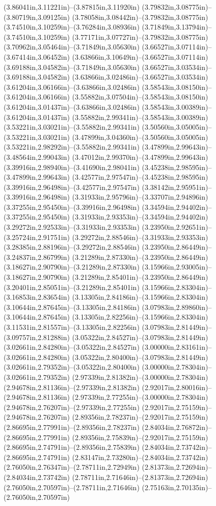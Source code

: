 (3.86041in,3.11221in)--(3.87815in,3.11920in) (3.79832in,3.08775in)--(3.80719in,3.09125in) (3.78058in,3.08442in)--(3.79832in,3.08775in) (3.74510in,3.10259in)--(3.76284in,3.08936in) (3.71849in,3.13794in)--(3.74510in,3.10259in) (3.77171in,3.07727in)--(3.79832in,3.08775in) (3.70962in,3.05464in)--(3.71849in,3.05630in) (3.66527in,3.07114in)--(3.67414in,3.06452in) (3.63866in,3.10649in)--(3.66527in,3.07114in) (3.69188in,3.04582in)--(3.71849in,3.05630in) (3.66527in,3.03534in)--(3.69188in,3.04582in) (3.63866in,3.02486in)--(3.66527in,3.03534in) (3.61204in,3.06166in)--(3.63866in,3.02486in) (3.58543in,3.08150in)--(3.61204in,3.06166in) (3.55882in,3.07504in)--(3.58543in,3.08150in) (3.61204in,3.01437in)--(3.63866in,3.02486in) (3.58543in,3.00389in)--(3.61204in,3.01437in) (3.55882in,2.99341in)--(3.58543in,3.00389in) (3.53221in,3.03021in)--(3.55882in,2.99341in) (3.50560in,3.05005in)--(3.53221in,3.03021in) (3.47899in,3.04360in)--(3.50560in,3.05005in) (3.53221in,2.98292in)--(3.55882in,2.99341in) (3.47899in,2.99643in)--(3.48564in,2.99043in) (3.47012in,2.99370in)--(3.47899in,2.99643in) (3.39916in,2.98940in)--(3.41690in,2.98041in) (3.45238in,2.98595in)--(3.47899in,2.99643in) (3.42577in,2.97547in)--(3.45238in,2.98595in) (3.39916in,2.96498in)--(3.42577in,2.97547in) (3.38142in,2.95951in)--(3.39916in,2.96498in) (3.31933in,2.95796in)--(3.33707in,2.94896in) (3.37255in,2.95450in)--(3.39916in,2.96498in) (3.34594in,2.94402in)--(3.37255in,2.95450in) (3.31933in,2.93353in)--(3.34594in,2.94402in) (3.29272in,2.92533in)--(3.31933in,2.93353in) (3.23950in,2.92651in)--(3.25724in,2.91751in) (3.29272in,2.88546in)--(3.31933in,2.93353in) (3.28385in,2.88196in)--(3.29272in,2.88546in) (3.23950in,2.86449in)--(3.24837in,2.86799in) (3.21289in,2.87330in)--(3.23950in,2.86449in) (3.18627in,2.90790in)--(3.21289in,2.87330in) (3.15966in,2.93005in)--(3.18627in,2.90790in) (3.21289in,2.85401in)--(3.23950in,2.86449in) (3.20401in,2.85051in)--(3.21289in,2.85401in) (3.15966in,2.83304in)--(3.16853in,2.83654in) (3.13305in,2.84186in)--(3.15966in,2.83304in) (3.10644in,2.87645in)--(3.13305in,2.84186in) (3.07983in,2.89860in)--(3.10644in,2.87645in) (3.13305in,2.82256in)--(3.15966in,2.83304in) (3.11531in,2.81557in)--(3.13305in,2.82256in) (3.07983in,2.81449in)--(3.09757in,2.81288in) (3.05322in,2.84527in)--(3.07983in,2.81449in) (3.02661in,2.84280in)--(3.05322in,2.84527in) (3.00000in,2.83161in)--(3.02661in,2.84280in) (3.05322in,2.80400in)--(3.07983in,2.81449in) (3.02661in,2.79352in)--(3.05322in,2.80400in) (3.00000in,2.78304in)--(3.02661in,2.79352in) (2.97339in,2.81382in)--(3.00000in,2.78304in) (2.94678in,2.81136in)--(2.97339in,2.81382in) (2.92017in,2.80016in)--(2.94678in,2.81136in) (2.97339in,2.77255in)--(3.00000in,2.78304in) (2.94678in,2.76207in)--(2.97339in,2.77255in) (2.92017in,2.75159in)--(2.94678in,2.76207in) (2.89356in,2.78237in)--(2.92017in,2.75159in) (2.86695in,2.77991in)--(2.89356in,2.78237in) (2.84034in,2.76872in)--(2.86695in,2.77991in) (2.89356in,2.75839in)--(2.92017in,2.75159in) (2.86695in,2.74791in)--(2.89356in,2.75839in) (2.84034in,2.73742in)--(2.86695in,2.74791in) (2.83147in,2.73280in)--(2.84034in,2.73742in) (2.76050in,2.76347in)--(2.78711in,2.72949in) (2.81373in,2.72694in)--(2.84034in,2.73742in) (2.78711in,2.71646in)--(2.81373in,2.72694in) (2.76050in,2.70597in)--(2.78711in,2.71646in) (2.75163in,2.70135in)--(2.76050in,2.70597in) 